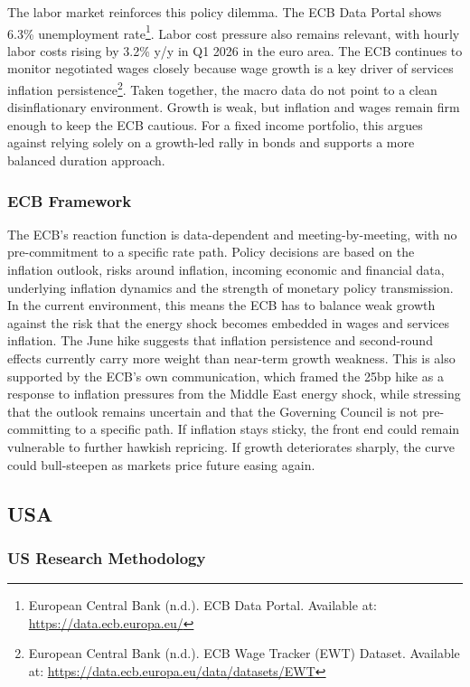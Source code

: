 \documentclass[11pt,a4paper]{article}
\begin{document}
The labor market reinforces this policy dilemma. The ECB Data Portal shows 6.3\% unemployment rate\footnote{European Central Bank (n.d.). ECB Data Portal. Available at: \url{https://data.ecb.europa.eu/}}. Labor cost pressure also remains relevant, with hourly labor costs rising by 3.2\% y/y in Q1 2026 in the euro area. The ECB continues to monitor negotiated wages closely because wage growth is a key driver of services inflation persistence\footnote{European Central Bank (n.d.). ECB Wage Tracker (EWT) Dataset. Available at: \url{https://data.ecb.europa.eu/data/datasets/EWT}}. Taken together, the macro data do not point to a clean disinflationary environment. Growth is weak, but inflation and wages remain firm enough to keep the ECB cautious. For a fixed income portfolio, this argues against relying solely on a growth-led rally in bonds and supports a more balanced duration approach.

\subsubsection{ECB Framework}

The ECB's reaction function is data-dependent and meeting-by-meeting, with no pre-commitment to a specific rate path. Policy decisions are based on the inflation outlook, risks around inflation, incoming economic and financial data, underlying inflation dynamics and the strength of monetary policy transmission. In the current environment, this means the ECB has to balance weak growth against the risk that the energy shock becomes embedded in wages and services inflation. The June hike suggests that inflation persistence and second-round effects currently carry more weight than near-term growth weakness. This is also supported by the ECB's own communication, which framed the 25bp hike as a response to inflation pressures from the Middle East energy shock, while stressing that the outlook remains uncertain and that the Governing Council is not pre-committing to a specific path. If inflation stays sticky, the front end could remain vulnerable to further hawkish repricing. If growth deteriorates sharply, the curve could bull-steepen as markets price future easing again.

\subsection{USA}

\subsubsection{US Research Methodology}
\end{document}
